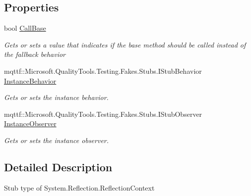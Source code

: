 \subsection*{Properties}
\begin{DoxyCompactItemize}
\item 
bool \hyperlink{class_system_1_1_reflection_1_1_fakes_1_1_stub_reflection_context_af18c2b3adf7cdf37a3f920e8a7fe58bb}{Call\-Base}
\begin{DoxyCompactList}\small\item\em Gets or sets a value that indicates if the base method should be called instead of the fallback behavior\end{DoxyCompactList}\item 
mqttf\-::\-Microsoft.\-Quality\-Tools.\-Testing.\-Fakes.\-Stubs.\-I\-Stub\-Behavior \hyperlink{class_system_1_1_reflection_1_1_fakes_1_1_stub_reflection_context_a2c66c45b9d5a4108392e592ace8a6ac9}{Instance\-Behavior}
\begin{DoxyCompactList}\small\item\em Gets or sets the instance behavior.\end{DoxyCompactList}\item 
mqttf\-::\-Microsoft.\-Quality\-Tools.\-Testing.\-Fakes.\-Stubs.\-I\-Stub\-Observer \hyperlink{class_system_1_1_reflection_1_1_fakes_1_1_stub_reflection_context_a3f13e50c3a79c1195dd24fd11c7548bd}{Instance\-Observer}
\begin{DoxyCompactList}\small\item\em Gets or sets the instance observer.\end{DoxyCompactList}\end{DoxyCompactItemize}


\subsection{Detailed Description}
Stub type of System.\-Reflection.\-Reflection\-Context



